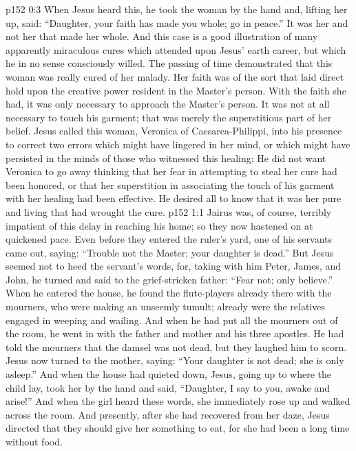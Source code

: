\vs p152 0:3 When Jesus heard this, he took the woman by the hand and, lifting her up, said: \textcolor{ubdarkred}{“Daughter, your faith has made you whole; go in peace.”} It was her  and not her  that made her whole. And this case is a good illustration of many apparently miraculous cures which attended upon Jesus’ earth career, but which he in no sense consciously willed. The passing of time demonstrated that this woman was really cured of her malady. Her faith was of the sort that laid direct hold upon the creative power resident in the Master’s person. With the faith she had, it was only necessary to approach the Master’s person. It was not at all necessary to touch his garment; that was merely the superstitious part of her belief. Jesus called this woman, Veronica of Caesarea\hyp{}Philippi, into his presence to correct two errors which might have lingered in her mind, or which might have persisted in the minds of those who witnessed this healing: He did not want Veronica to go away thinking that her fear in attempting to steal her cure had been honored, or that her superstition in associating the touch of his garment with her healing had been effective. He desired all to know that it was her pure and living  that had wrought the cure.
\vs p152 1:1 Jairus was, of course, terribly impatient of this delay in reaching his home; so they now hastened on at quickened pace. Even before they entered the ruler’s yard, one of his servants came out, saying: “Trouble not the Master; your daughter is dead.” But Jesus seemed not to heed the servant’s words, for, taking with him Peter, James, and John, he turned and said to the grief\hyp{}stricken father: \textcolor{ubdarkred}{“Fear not; only believe.”} When he entered the house, he found the flute\hyp{}players already there with the mourners, who were making an unseemly tumult; already were the relatives engaged in weeping and wailing. And when he had put all the mourners out of the room, he went in with the father and mother and his three apostles. He had told the mourners that the damsel was not dead, but they laughed him to scorn. Jesus now turned to the mother, saying: \textcolor{ubdarkred}{“Your daughter is not dead; she is only asleep.”} And when the house had quieted down, Jesus, going up to where the child lay, took her by the hand and said, \textcolor{ubdarkred}{“Daughter, I say to you, awake and arise!”} And when the girl heard these words, she immediately rose up and walked across the room. And presently, after she had recovered from her daze, Jesus directed that they should give her something to eat, for she had been a long time without food.
